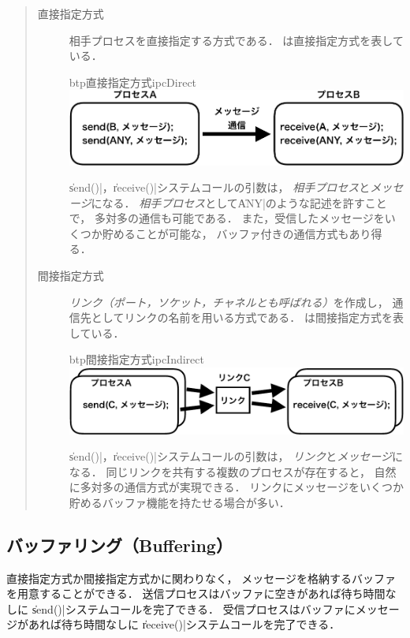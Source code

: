 \begin{quote}
  \begin{description}
  \item[直接指定方式]
    相手プロセスを直接指定する方式である．
    は直接指定方式を表している．

    \begin{myfig}{btp}{直接指定方式}{ipcDirect}
      \includegraphics[scale=0.6]{Fig/ipcDirect-crop.pdf}
    \end{myfig}

    \|send()|，\|receive()|システムコールの引数は，
    \emph{相手プロセス}と\emph{メッセージ}になる．
    \emph{相手プロセス}として\|ANY|のような記述を許すことで，
    多対多の通信も可能である．
    また，受信したメッセージをいくつか貯めることが可能な，
    バッファ付きの通信方式もあり得る．

  \item[間接指定方式]
    \emph{リンク（ポート，ソケット，チャネルとも呼ばれる）}を作成し，
    通信先としてリンクの名前を用いる方式である．
    は間接指定方式を表している．

    \begin{myfig}{btp}{間接指定方式}{ipcIndirect}
      \includegraphics[scale=0.6]{Fig/ipcIndirect-crop.pdf}
    \end{myfig}

    \|send()|，\|receive()|システムコールの引数は，
    \emph{リンク}と\emph{メッセージ}になる．
    同じリンクを共有する複数のプロセスが存在すると，
    自然に多対多の通信方式が実現できる．
    リンクにメッセージをいくつか貯めるバッファ機能を持たせる場合が多い．
  \end{description}
\end{quote}

\subsection{バッファリング（Buffering）}
直接指定方式か間接指定方式かに関わりなく，
メッセージを格納するバッファを用意することができる．
送信プロセスはバッファに空きがあれば待ち時間なしに
\|send()|システムコールを完了できる．
受信プロセスはバッファにメッセージがあれば待ち時間なしに
\|receive()|システムコールを完了できる．

